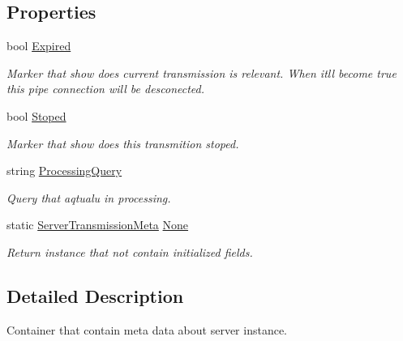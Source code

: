 \subsection*{Properties}
\begin{DoxyCompactItemize}
\item 
bool \mbox{\hyperlink{class_pipes_provider_1_1_server_transmission_meta_acdc3e400b26c044443a9c3ce367433f4}{Expired}}
\begin{DoxyCompactList}\small\item\em Marker that show does current transmission is relevant. When it\textquotesingle{}ll become true this pipe connection will be desconected. \end{DoxyCompactList}\item 
bool \mbox{\hyperlink{class_pipes_provider_1_1_server_transmission_meta_a9b501faba9c2cb9ed8873f1935d95b7c}{Stoped}}
\begin{DoxyCompactList}\small\item\em Marker that show does this transmition stoped. \end{DoxyCompactList}\item 
string \mbox{\hyperlink{class_pipes_provider_1_1_server_transmission_meta_abdf46c54f238645728488c757a53097e}{Processing\+Query}}
\begin{DoxyCompactList}\small\item\em Query that aqtualu in processing. \end{DoxyCompactList}\item 
static \mbox{\hyperlink{class_pipes_provider_1_1_server_transmission_meta}{Server\+Transmission\+Meta}} \mbox{\hyperlink{class_pipes_provider_1_1_server_transmission_meta_aad6b35f35e7976ae9ee3f386b65dd128}{None}}
\begin{DoxyCompactList}\small\item\em Return instance that not contain initialized fields. \end{DoxyCompactList}\end{DoxyCompactItemize}


\subsection{Detailed Description}
Container that contain meta data about server instance. 



